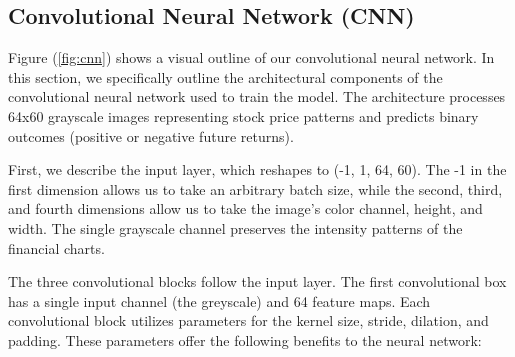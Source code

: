 \documentclass[12pt]{article}
\begin{document}
\subsection*{Convolutional Neural Network (CNN)}

Figure (\ref{fig:cnn}) shows a visual outline of our convolutional neural network. In this section, we specifically outline the architectural components of the convolutional neural network used to train the model. The architecture processes 64x60 grayscale images representing stock price patterns and predicts binary outcomes (positive or negative future returns).

First, we describe the input layer, which reshapes to (-1, 1, 64, 60). The -1 in the first dimension allows us to take an arbitrary batch size, while the second, third, and fourth dimensions allow us to take the image's color channel, height, and width. The single grayscale channel preserves the intensity patterns of the financial charts. 

The three convolutional blocks follow the input layer. The first convolutional box has a single input channel (the greyscale) and 64 feature maps. Each convolutional block utilizes parameters for the kernel size, stride, dilation, and padding. These parameters offer the following benefits to the neural network:
\end{document}

